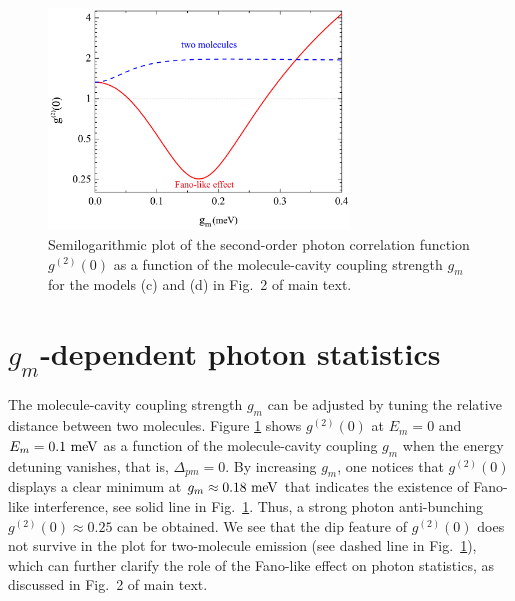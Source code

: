 \documentclass[aps,prb,
superscriptaddress,
,floatfix,footinbib,longbibliography,
preprint
]{revtex4-2}
\begin{document}
\begin{figure}[h]
\centering
\includegraphics[width=8cm]{fano-mep.pdf}
\caption{Semilogarithmic plot of the second-order photon correlation function $g^{(2)}(0)$ as a function of the molecule-cavity coupling strength $g_{m}$ for the models (c) and (d) in Fig.~2 of main text.}
\label{fano-mep}
\end{figure}
\section{$g_{m}$-dependent photon statistics}
\label{gm-photon}
The molecule-cavity coupling strength $g_{m}$ can be adjusted by tuning the relative distance between two molecules.
 Figure \ref{fano-mep} shows $g^{(2)}(0)$ at
$E_{m}=0$ and $E_{m}=0.1~{\rm meV}$ as a function of the molecule-cavity coupling $g_{m}$ when the energy detuning vanishes, that is, $\Delta_{pm}=0$.
By increasing $g_{m}$, one notices that $g^{(2)}(0)$ displays a clear minimum at $g_{m}\approx 0.18~{\rm meV}$ that indicates the existence of Fano-like interference, see solid line in Fig.~\ref{fano-mep}.
Thus, a strong photon anti-bunching $g^{(2)}(0)\approx0.25$ can be obtained.
We see that the dip feature of $g^{(2)}(0)$ does not survive in the plot for two-molecule emission (see dashed line in Fig.~\ref{fano-mep}), which can further clarify the role of the Fano-like effect on photon statistics, as discussed in Fig.~2 of main text.


\iffalse
\end{document}
